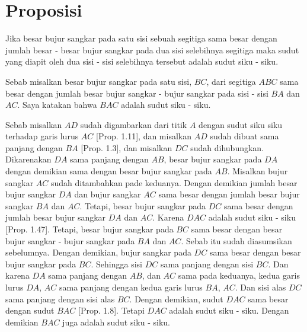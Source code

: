 \documentclass[a4paper]{book}
\begin{document}
\section*{\centering Proposisi \thesection} 

Jika besar bujur sangkar pada satu sisi sebuah segitiga sama besar dengan 
jumlah besar - besar bujur sangkar pada dua sisi selebihnya segitiga maka 
sudut yang diapit oleh dua sisi - sisi selebihnya tersebut adalah sudut
siku - siku.

\begin{center}
\end{center}

Sebab misalkan besar bujur sangkar pada satu sisi, $BC$, dari segitiga
$ABC$ sama besar dengan jumlah besar bujur sangkar - bujur sangkar pada 
sisi - sisi $BA$ dan $AC$. Saya katakan bahwa $BAC$ adalah sudut siku - siku.

Sebab misalkan $AD$ sudah digambarkan dari titik $A$ dengan sudut siku
siku terhadap garis lurus $AC$ [Prop. 1.11], dan misalkan $AD$ sudah dibuat
sama panjang dengan $BA$ [Prop. 1.3], dan misalkan $DC$ sudah dihubungkan.
Dikarenakan $DA$ sama panjang dengan $AB$, besar bujur sangkar pada $DA$
dengan demikian sama dengan besar bujur sangkar pada $AB$. Misalkan bujur
sangkar $AC$ sudah ditambahkan pade keduanya. Dengan demikian jumlah 
besar bujur sangkar $DA$ dan bujur sangkar $AC$ sama besar dengan jumlah
besar bujur sangkar $BA$ dan $AC$. Tetapi, besar bujur sangkar pada $DC$
sama besar dengan jumlah besar bujur sangkar $DA$ dan $AC$. Karena $DAC$
adalah sudut siku - siku [Prop. 1.47]. Tetapi, besar bujur sangkar pada
$BC$ sama besar dengan besar bujur sangkar - bujur sangkar pada $BA$ dan
$AC$. Sebab itu sudah diasumsikan sebelumnya. Dengan demikian, bujur 
sangkar pada $DC$ sama besar dengan besar bujur sangkar pada $BC$. 
Sehingga sisi $DC$ sama panjang dengan sisi $BC$. Dan karena $DA$ sama
panjang dengan $AB$, dan $AC$ sama pada keduanya, kedua garis lurus 
$DA$, $AC$ sama panjang dengan kedua garis lurus $BA$, $AC$. Dan sisi 
alas $DC$ sama panjang dengan sisi alas $BC$. Dengan demikian, sudut
$DAC$ sama besar dengan sudut $BAC$ [Prop. 1.8]. Tetapi $DAC$ adalah 
sudut siku - siku. Dengan demikian $BAC$ juga adalah sudut siku - siku.
\end{document}
